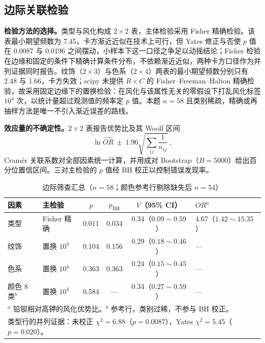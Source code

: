 \documentclass[12pt]{ctexart}
\begin{document}
\subsection{边际关联检验}

\textbf{检验方法的选择。}类型与风化构成 $2\times 2$ 表，主体检验采用 Fisher 精确检验。该表最小期望频数为 7.45，卡方渐近近似在技术上可行，但 Yates 修正与否使 $p$ 值在 0.0087 与 0.0196 之间摆动，小样本下这一口径之争足以动摇结论；Fisher 检验在边缘和固定的条件下精确计算条件分布，不依赖渐近近似，两种卡方口径作为并列证据同时报告。纹饰（$2\times 3$）与色系（$2\times 4$）两表的最小期望频数分别只有 2.48 与 1.66，卡方失效；scipy 未提供 $R\times C$ 的 Fisher--Freeman--Halton 精确检验，故采用固定边缘下的置换检验：在风化与该属性无关的零假设下打乱风化标签 $10^4$ 次，以统计量超过观测值的频率定 $p$ 值。本题 $n=58$ 且类别稀疏，精确或再抽样方法是唯一不引入渐近误差的路线。

\textbf{效应量的不确定性。}$2\times 2$ 表报告优势比及其 Woolf 区间
\begin{equation}
\ln \widehat{OR}\ \pm\ 1.96\sqrt{\sum_{ij}\frac{1}{n_{ij}}}\, ,
\label{eq:orci}
\end{equation}
Cramér 关联系数对全部因素统一计算，并用成对 Bootstrap（$B=5000$）给出百分位置信区间。三对主检验的 $p$ 值经 BH 校正以控制错误发现率。

\begin{table}[htbp]
\centering
\caption{边际筛查汇总（$n=58$；颜色参考行剔除缺失后 $n=54$）}
\label{tab:marginal}
\begin{tabular}{llcccl}
\toprule
因素 & 主检验 & $p$ & $p_{\mathrm{BH}}$ & $V$（95\% CI） & $OR^{a}$ \\
\midrule
类型 & Fisher 精确 & 0.011 & 0.034 & 0.34（$0.09\sim 0.59$） & 4.67（$1.42\sim 15.35$） \\
纹饰 & 置换 $10^4$ & 0.104 & 0.156 & 0.29（$0.18\sim 0.46$） & — \\
色系 & 置换 $10^4$ & 0.363 & 0.363 & 0.24（$0.15\sim 0.45$） & — \\
颜色 8 类$^{b}$ & 置换 $10^4$ & 0.584 & — & 0.34（$0.27\sim 0.59$） & — \\
\bottomrule
\multicolumn{6}{l}{\footnotesize $^{a}$ 铅钡相对高钾的风化优势比。$^{b}$ 参考行，类别过稀，不参与 BH 校正。}\\
\multicolumn{6}{l}{\footnotesize 类型行的并列证据：未校正 $\chi^2=6.88$（$p=0.0087$），Yates $\chi^2=5.45$（$p=0.020$）。}\\
\end{tabular}
\end{table}
\end{document}
